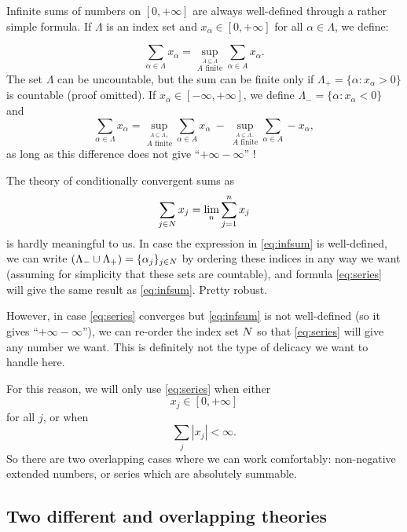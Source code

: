 \documentclass[
]{book}
\theoremstyle{definition}
\theoremstyle{remark}
\let\mathbb\relax %
\newcommand{\N}{\mathbb{N}}
\begin{document}
Infinite sums of numbers on \([0,+\infty]\) are always well-defined
through a rather simple formula. If \(\Lambda\) is an index set and
\(x_\alpha \in [0,+\infty]\) for all \(\alpha \in \Lambda\), we define:

\[\nonumber
\sum_{\alpha \in \Lambda} x_\alpha = \sup_{\stackrel{A \subseteq \Lambda}{A \text{ finite}}} \sum_{\alpha \in A} x_\alpha
.\] The set \(\Lambda\) can be uncountable, but the sum can be finite only
if \(\Lambda_+ = \{\alpha:x_\alpha>0\}\) is countable (proof omitted). If
\(x_\alpha \in [-\infty,+\infty]\), we define
\(\Lambda_- = \{\alpha:x_\alpha<0\}\) and
\begin{equation}
\sum_{\alpha \in \Lambda} x_\alpha =
\sup_{\stackrel{A \subseteq \Lambda_+}{A \text{ finite}}} \sum_{\alpha \in A} x_\alpha
\
-
\
\sup_{\stackrel{A \subseteq \Lambda_-}{A \text{ finite}}} \sum_{\alpha \in A} -x_\alpha
,
\label{eq:infsum}
\end{equation}
as long as this difference does not give ``\(+\infty-\infty\)'' !

The theory of conditionally convergent sums as
\begin{equation}
\sum_{j \in \N} x_j
=
\lim_n
\sum_{j = 1}^n x_j
\label{eq:series}
\end{equation}
is hardly meaningful to us. In case the expression
in \eqref{eq:infsum} is well-defined, we can write
\((\Lambda_- \cup \Lambda_+) = \{\alpha_j\}_{j\in\N}\) by ordering these
indices in any way we want (assuming for simplicity that these sets are
countable), and formula \eqref{eq:series} will give the same result
as \eqref{eq:infsum}. Pretty robust.

However, in case \eqref{eq:series} converges
but \eqref{eq:infsum} is not well-defined (so it gives
``\(+\infty-\infty\)''), we can re-order the index set \(\N\) so
that \eqref{eq:series} will give any number we want. This is definitely
not the type of delicacy we want to handle here.

For this reason, we will only
use \eqref{eq:series} when either \[x_j \in [0,+\infty]\] for all \(j\),
or when \[\sum_j |x_j| < \infty .\] So there are two overlapping cases
where we can work comfortably: non-negative extended numbers, or series
which are absolutely summable.

\hypertarget{two-different-and-overlapping-theories}{%
\subsection{Two different and overlapping theories}\label{two-different-and-overlapping-theories}}
\end{document}
